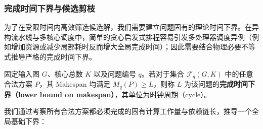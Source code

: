 \documentclass[anonymous,withtoc]{gmcm2026}
\begin{document}
\subsubsection{完成时间下界与候选剪枝}

为了在受限时间内高效筛选候选解，我们需要建立问题固有的理论时间下界。在异构流水线与多核心调度中，简单的贪心启发式排程容易引发多处理器调度异例（例如增加资源或减少局部耗时反而增大全局完成时间）\cite{ref2}；因此需要结合物理必要不等式推导严格的完成时间下界。

固定输入图 \(G\)、核心总数 \(K\) 以及问题编号 \(q\)。若对于集合 \(\mathcal{F}_q(G, K)\) 中的任意合法方案 \(P\)，其 Makespan 均满足 \(M_q(P) \ge L\)，则称 \(L\) 为该问题的\textbf{完成时间下界（lower bound on makespan）}，其单位为时钟周期（cycle）。

我们通过考察所有合法方案都必须完成的固有计算工作量与依赖链长，推导一个全局基础下界：
\end{document}
